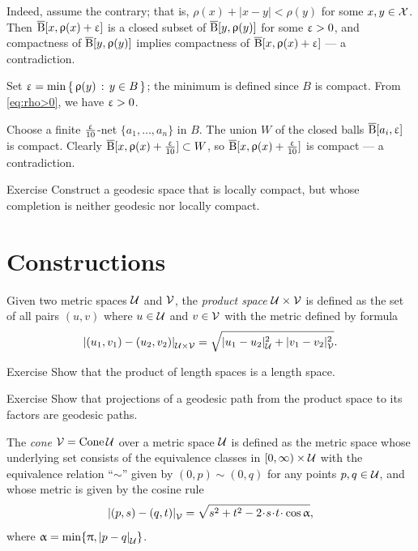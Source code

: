 Indeed, 
assume the contrary; that is, $\rho(x)+|x-y|<\rho(y)$ for some $x,y\z\in \spc{X}$.
Then 
$\overline{\mathrm{B}}{}[x,\upvarrho(x)+\upvarepsilon]$ is a closed subset of $\overline{\mathrm{B}}{}[y,\upvarrho(y)]$ for some $\upvarepsilon>0$, and compactness of $\overline{\mathrm{B}}{}[y,\upvarrho(y)]$ implies compactness of $\overline{\mathrm{B}}{}[x,\upvarrho(x)+\upvarepsilon]$ --- a contradiction.
\claimqeds

Set $\eps=\min\set{\rho(y)}{y\in B}$; the minimum is defined since $B$ is compact.
From \ref{eq:rho>0}, we have $\upvarepsilon>0$.

Choose a finite $\tfrac{\upvarepsilon}{10}$-net $\{a_1,\ldots,a_n\}$ in $B$.
The union $W$ of the closed balls $\overline{\mathrm{B}}{}[a_i,\upvarepsilon]$ is compact.
Clearly 
$\cBall[x,\rho(x)+\frac\eps{10}]\subset W$, so $\overline{\mathrm{B}}{}[x,\upvarrho(x)+\frac{\upvarepsilon}{10}]$ is compact ---
a contradiction.
\qeds

\begin{thm}{Exercise}\label{exercise from BH}
Construct a geodesic space that is locally compact,
but whose completion is neither geodesic nor locally compact.
\end{thm}

\section{Constructions}\label{sec:constructions}

Given two metric spaces $\mathcal{U}$ and $\mathcal{V}$, the \emph{product space} 
$\spc{U}\times\spc{V}$ is defined as the set of all pairs $(u,v)$ where $u\in\spc{U}$ and $v\in \spc{V}$ 
with the metric defined by formula
\[\dist{(u_1,v_1)}{(u_2,v_2)}{\spc{U}\times\spc{V}}=\sqrt{\dist[2]{u_1}{u_2}{\spc{U}}+\dist[2]{v_1}{v_2}{\spc{V}}}.\]

\begin{thm}{Exercise}\label{ex:length-prod}
Show that the product of length spaces is a length space.
\end{thm}

\begin{thm}[!]{Exercise}\label{ex:geod-prod}
Show that projections of a geodesic path from the product space to its factors are geodesic paths.
\end{thm}

The \emph{cone} $\mathcal{V}=\mathop{\rm Cone}\nolimits\mathcal{U}$ over a metric space $\mathcal{U}$
is defined as the metric space whose underlying set consists of the
equivalence classes in
$[0,\infty)\times \spc{U}$ with the equivalence relation ``$\sim$'' given by $(0,p)\sim (0,q)$ for any points $p,q\in\spc{U}$,
and whose metric is given by the cosine rule
\[
\dist{(p,s)}{(q,t)}{\spc{V}} 
=
\sqrt{s^2+t^2-2\cdot s\cdot t\cdot \cos\alpha},
\]
where $\alpha= \min\{\pi, \dist{p}{q}{\spc{U}}\}$.

